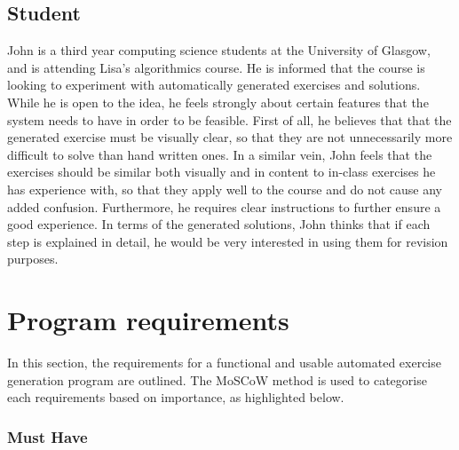\documentclass{l4proj}
\begin{document}
\subsection{Student}

John is a third year computing science students at the University of Glasgow, and is attending Lisa's algorithmics course. He is informed that the course is looking to experiment with automatically generated exercises and solutions. While he is open to the idea, he feels strongly about certain features that the system needs to have in order to be feasible. First of all, he believes that that the generated exercise must be visually clear, so that they are not unnecessarily more difficult to solve than hand written ones. In a similar vein, John feels that the exercises should be similar both visually and in content to in-class exercises he has experience with, so that they apply well to the course and do not cause any added confusion. Furthermore, he requires clear instructions to further ensure a good experience. In terms of the generated solutions, John thinks that if each step is explained in detail, he would be very interested in using them for revision purposes.

\section{Program requirements}

In this section, the requirements for a functional and usable automated exercise generation program are outlined. The MoSCoW method is used to categorise each requirements based on importance, as highlighted below.

\subsubsection{Must Have}
\end{document}
